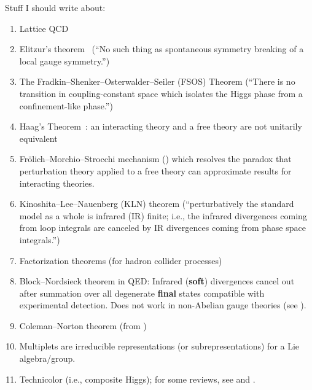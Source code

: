 Stuff I should write about:
\begin{enumerate}
\item Lattice QCD~\cite{Lepage:1998dt}
\item Elitzur's theorem~\cite{Elitzur:1975im} (``No such thing as spontaneous symmetry breaking of a local gauge symmetry.'')
\item The Fradkin--Shenker--Osterwalder--Seiler (FSOS) Theorem (``There is no transition in coupling-constant space which isolates the Higgs phase from a confinement-like phase.'')
\item Haag's Theorem~\cite{Haag:1992hx}: an interacting theory and a
  free theory are not unitarily equivalent
\item Fr\"{o}lich--Morchio--Strocchi mechanism ()
  which resolves the paradox that perturbation theory applied to a free
  theory can approximate results for interacting theories.
\item Kinoshita--Lee--Nauenberg (KLN) theorem (``perturbatively the standard model as a whole is infrared (IR) finite; i.e., the infrared divergences coming from loop integrals are canceled by IR divergences coming from phase space integrals.'')
\item Factorization theorems (for hadron collider processes) 
\item Block--Nordsieck theorem in QED: Infrared (\textbf{soft}) divergences
  cancel out after summation over all degenerate \textbf{final} states
  compatible with experimental detection. Does not work in non-Abelian
  gauge theories (see {\tt{}}).
\item Coleman--Norton theorem (from {\tt{}})
\item Multiplets are irreducible representations (or subrepresentations)
  for a Lie algebra/group.
\item Technicolor (i.e., composite Higgs); for some reviews, see
   and .
\end{enumerate}






